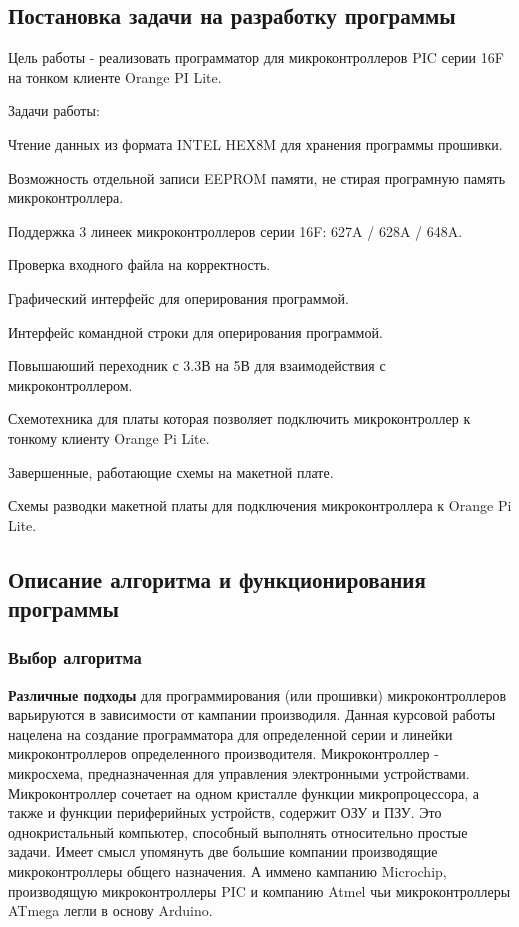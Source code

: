 \subsection{Постановка задачи на разработку программы}
    Цель работы - реализовать программатор для микроконтроллеров PIC серии 16F на тонком клиенте Orange PI Lite.

\bigskip
Задачи работы:

\smallskip
\begin{my_enumerate}
\item Чтение данных из формата INTEL HEX8M для хранения программы прошивки.
\item Возможность отдельной записи EEPROM памяти, не стирая програмную память микроконтроллера.
\item Поддержка 3 линеек микроконтроллеров серии 16F: 627A / 628A / 648A.
\item Проверка входного файла на корректность.
\item Графический интерфейс для оперирования программой.
\item Интерфейс командной строки для оперирования программой.
\item Повышаюший переходник с 3.3В на 5В для взаимодействия с микроконтроллером.
\item Схемотехника для платы которая позволяет подключить микроконтроллер к тонкому клиенту Orange Pi Lite.
\item Завершенные, работающие схемы на макетной плате.
\item Схемы разводки макетной платы для подключения микроконтроллера к Orange Pi Lite. 
\end{my_enumerate}


\subsection{Описание алгоритма и функционирования программы}


\subsubsection{Выбор алгоритма}

\textbf{Различные подходы}
для программирования (или прошивки) микроконтроллеров варьируются в зависимости от кампании производиля. 
Данная курсовой работы нацелена на создание программатора для определенной серии и линейки микроконтроллеров определенного производителя. Микроконтроллер - микросхема, предназначенная для управления электронными устройствами. Микроконтроллер сочетает на одном кристалле функции микропроцессора, а также и функции периферийных устройств, содержит ОЗУ и ПЗУ. Это однокристальный компьютер, способный выполнять относительно простые задачи.
Имеет смысл упомянуть две большие компании производящие микроконтроллеры общего назначения. А иммено кампанию Microchip, производящую микроконтроллеры PIC и компанию Atmel чьи микроконтроллеры ATmega легли в основу Arduino.

